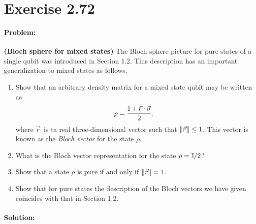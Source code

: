 \section*{Exercise 2.72}
\paragraph{Problem:} \textbf{(Bloch sphere for mixed states)} The Bloch sphere picture for pure states of a single qubit was introduced in Section 1.2. This description has an important generalization to mixed states as follows.
\begin{enumerate}[(1)]
    \item Show that an arbitrary density matrix for a mixed state qubit may be written as 
        \begin{equation}
            \rho = \frac{\mathbb{I} + \vec{r} \cdot \vec{\sigma}}{2},
        \end{equation}
    where $\vec{r}$ is ta real three-dimensional vector such that $\norm{\vec{r}} \leq 1$. This vector is known as the \textit{Bloch vector} for the state $\rho$.
    \item What is the Bloch vector representation for the state $\rho = \mathbb{I} / 2$?
    \item Show that a state $\rho$ is pure if and only if $\norm{\vec{r}} = 1$.
    \item Show that for pure states the description of the Bloch vectors we have given coincides with that in Section 1.2.
\end{enumerate}

\paragraph{Solution:}